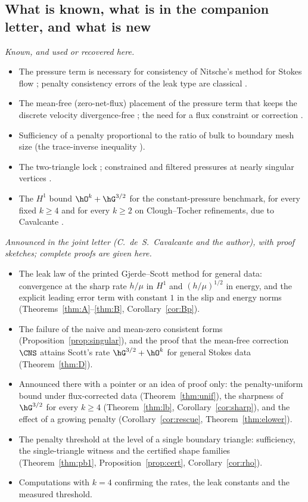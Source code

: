 \subsection{What is known, what is in the companion letter, and what is new}\label{sec:knownnew}
\emph{Known, and used or recovered here.}
\begin{itemize}
\item The pressure term is necessary for consistency of Nitsche's method for Stokes flow \cite{BurmanHansboLarson2019Stokes}; penalty consistency errors of the leak type are classical \cite{Babuska1973}.
\item The mean-free (zero-net-flux) placement of the pressure term that keeps the discrete velocity divergence-free \cite{FrachonNilssonZahedi2024}; the need for a flux constraint or correction \cite{LiuNeilanOtus2023,EickmannScottTscherpel2025}.
\item Sufficiency of a penalty proportional to the ratio of bulk to boundary mesh size (the trace-inverse inequality \cite{Stenberg1995,JuntunenStenberg2009}).
\item The two-triangle lock \cite{ScottPrize,GjerdeScott2024}; constrained and filtered pressures at nearly singular vertices \cite{GrassleBohneSauter2024,Park2020,BohneGrassleSauter2025}.
\item The $H^1$ bound $\hO^k+\hG^{3/2}$ for the constant-pressure benchmark, for every fixed $k\ge4$ and for every $k\ge2$ on Clough--Tocher refinements, due to Cavalcante \cite[Thm.~5.2, Cor.~5.3]{Cavalcante}.
\end{itemize}
\emph{Announced in the joint letter \cite{CavalcantePadhiLetter} (C.~de~S.~Cavalcante and the author), with proof sketches; complete proofs are given here.}
\begin{itemize}
\item The leak law of the printed Gjerde--Scott method for general data: convergence at the sharp rate $h/\mu$ in $H^1$ and $(h/\mu)^{1/2}$ in energy, and the explicit leading error term with constant $1$ in the slip and energy norms (Theorems~\ref{thm:A}--\ref{thm:B}, Corollary~\ref{cor:Bp}).
\item The failure of the naive and mean-zero consistent forms (Proposition~\ref{prop:singular}), and the proof that the mean-free correction $\CNS$ attains Scott's rate $\hG^{3/2}+\hO^k$ for general Stokes data (Theorem~\ref{thm:D}).
\item Announced there with a pointer or an idea of proof only: the penalty-uniform bound under flux-corrected data (Theorem~\ref{thm:unif}), the sharpness of $\hG^{3/2}$ for every $k\ge4$ (Theorem~\ref{thm:lb}, Corollary~\ref{cor:sharp}), and the effect of a growing penalty (Corollary~\ref{cor:rescue}, Theorem~\ref{thm:elower}).
\item The penalty threshold at the level of a single boundary triangle: sufficiency, the single-triangle witness and the certified shape families (Theorem~\ref{thm:pb1}, Proposition~\ref{prop:cert}, Corollary~\ref{cor:rho}).
\item Computations with $k=4$ confirming the rates, the leak constants and the measured threshold.
\end{itemize}
